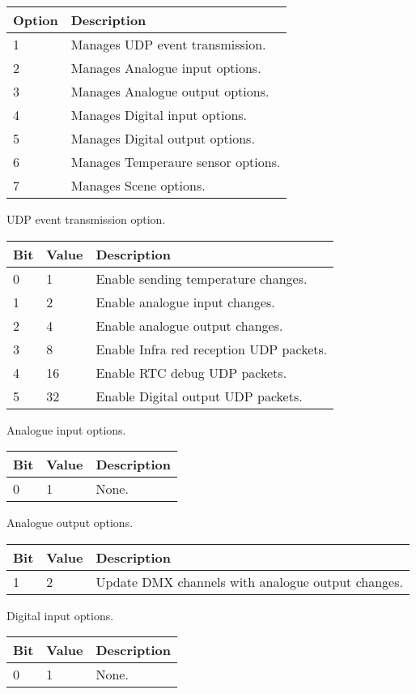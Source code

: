 \begin{tabular}{l|p{12cm}}
Option&Description\\
\hline
1&Manages UDP event transmission.\\
2&Manages Analogue input options.\\
3&Manages Analogue output options.\\
4&Manages Digital input options.\\
5&Manages Digital output options.\\
6&Manages Temperaure sensor options.\\
7&Manages Scene options.\\
\end{tabular}

UDP event transmission option.

\begin{tabular}{l|l|p{12cm}}
Bit&Value&Description\\
\hline
0&1&Enable sending temperature changes.\\
1&2&Enable analogue input changes.\\
2&4&Enable analogue output changes.\\
3&8&Enable Infra red reception UDP packets.\\
4&16&Enable RTC debug UDP packets.\\
5&32&Enable Digital output UDP packets.\\
\end{tabular}

Analogue input options.

\begin{tabular}{l|l|p{12cm}}
Bit&Value&Description\\
\hline
0&1&None.\\
\end{tabular}

Analogue output options.

\begin{tabular}{l|l|p{12cm}}
Bit&Value&Description\\
\hline
1&2&Update DMX channels with analogue output changes.\\
\end{tabular}

Digital input options.

\begin{tabular}{l|l|p{12cm}}
Bit&Value&Description\\
\hline
0&1&None.\\
\end{tabular}

